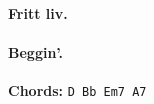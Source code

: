 \documentclass[%
twoside,                 %
final,                   %
10pt]{article}
\begin{document}
\paragraph{Fritt liv.}





\paragraph{Beggin'.}
\textbf{Chords:} \Verb!D Bb Em7 A7!






\printindex
\end{document}
